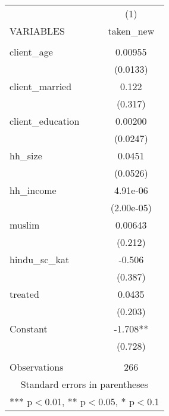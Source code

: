 \begin{tabular}{lc} \hline
 & (1) \\
VARIABLES & taken\_new \\ \hline
 &  \\
client\_age & 0.00955 \\
 & (0.0133) \\
client\_married & 0.122 \\
 & (0.317) \\
client\_education & 0.00200 \\
 & (0.0247) \\
hh\_size & 0.0451 \\
 & (0.0526) \\
hh\_income & 4.91e-06 \\
 & (2.00e-05) \\
muslim & 0.00643 \\
 & (0.212) \\
hindu\_sc\_kat & -0.506 \\
 & (0.387) \\
treated & 0.0435 \\
 & (0.203) \\
Constant & -1.708** \\
 & (0.728) \\
 &  \\
 Observations & 266 \\ \hline
\multicolumn{2}{c}{ Standard errors in parentheses} \\
\multicolumn{2}{c}{ *** p$<$0.01, ** p$<$0.05, * p$<$0.1} \\
\end{tabular}
